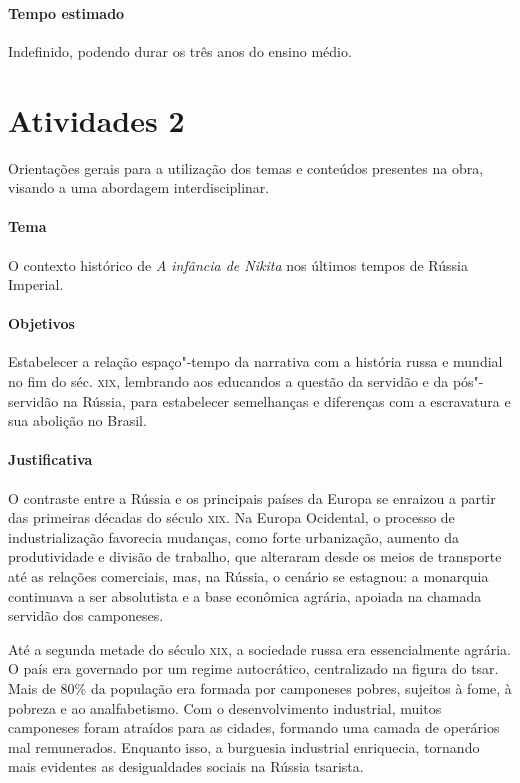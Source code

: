 \documentclass{article}
\begin{document}
\paragraph{Tempo estimado} Indefinido, podendo durar os três anos do
ensino médio.

\section{Atividades 2}

Orientações gerais para a utilização dos temas e conteúdos
presentes na obra, visando a uma abordagem interdisciplinar.

\paragraph{Tema} O contexto histórico de \emph{A infância de Nikita} nos últimos tempos de Rússia Imperial.


\paragraph{Objetivos}
Estabelecer a relação espaço"-tempo da narrativa com a história russa e
mundial no fim do séc. \textsc{xix}, lembrando aos educandos a questão da
servidão e da pós"-servidão na Rússia, para estabelecer semelhanças e
diferenças com a escravatura e sua abolição no Brasil.

\paragraph{Justificativa}
O contraste entre a Rússia e os principais países da Europa se enraizou
a partir das primeiras décadas do século \textsc{xix}. Na Europa Ocidental, o
processo de industrialização favorecia mudanças, como forte urbanização,
aumento da produtividade e divisão de trabalho, que alteraram desde os
meios de transporte até as relações comerciais, mas, na Rússia, o
cenário se estagnou: a monarquia continuava a ser absolutista e a base
econômica agrária, apoiada na chamada servidão dos camponeses.

Até a segunda metade do século \textsc{xix}, a sociedade russa era essencialmente
agrária. O país era governado por um regime autocrático, centralizado na
figura do tsar. Mais de 80\% da população era formada por camponeses
pobres, sujeitos à fome, à pobreza e ao analfabetismo. Com o
desenvolvimento industrial, muitos camponeses foram atraídos para as
cidades, formando uma camada de operários mal remunerados. Enquanto
isso, a burguesia industrial enriquecia, tornando mais evidentes as
desigualdades sociais na Rússia tsarista.
\end{document}
